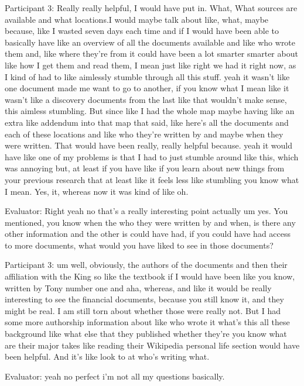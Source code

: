 \documentclass{l4proj}
\begin{document}
\begin{appendices}
Participant 3: Really really helpful, I would have put in. What, What sources are available and what locations.I would maybe talk about like, what, maybe because, like I wasted seven days each time and if I would have been able to basically have like an overview of all the documents available and like who wrote them and, like where they're from it could have been a lot smarter smarter about like how I get them and read them, I mean just like right we had it right now, as I kind of had to like aimlessly stumble through all this stuff. yeah it wasn't like one document made me want to go to another, if you know what I mean like it wasn't like a discovery documents from the last like that wouldn't make sense, this aimless stumbling. But since like I had the whole map maybe having like an extra like addendum into that map that said, like here's all the documents and each of these locations and like who they're written by and maybe when they were written. That would have been really, really helpful because. yeah it would have like one of my problems is that I had to just stumble around like this, which was annoying but, at least if you have like if you learn about new things from your previous research that at least like it feels less like stumbling you know what I mean. Yes, it, whereas now it was kind of like oh.





Evaluator: Right yeah no that's a really interesting point actually um yes. You mentioned, you know when the who they were written by and when, is there any other information and the other is could have had, if you could have had access to more documents, what would you have liked to see in those documents?

Participant 3: um well, obviously, the authors of the documents and then their affiliation with the King so like the textbook if I would have been like you know, written by Tony number one and aha, whereas, and like it would be really interesting to see the financial documents, because you still know it, and they might be real. I am still torn about whether those were really not. But I had some more authorship information about like who wrote it what's this all these background like what else that they published whether they're you know what are their major takes like reading their Wikipedia personal life section would have been helpful. And it's like look to at who's writing what.

Evaluator: yeah no perfect i'm not all my questions basically.


\end{appendices}
\end{document}
